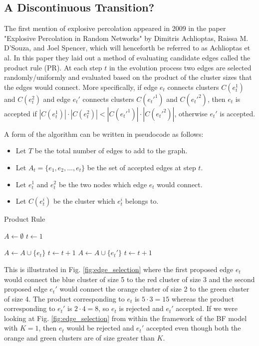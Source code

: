 \subsection{A Discontinuous Transition?}
The first mention of explosive percolation appeared in 2009 in the paper "Explosive Percolation in Random Networks" \cite{Achlioptas_1} by Dimitris Achlioptas, Raissa M. D’Souza, and Joel Spencer, which will henceforth be referred to as Achlioptas et al.
In this paper they laid out a method of evaluating candidate edges called the product rule (PR).
At each step $t$ in the evolution process two edges are selected randomly/uniformly and evaluated based on the product of the cluster sizes that the edges would connect.
More specifically, if edge $e_t$ connects clusters $C(e_t^1)$ and $C(e_t^2)$ and edge $e_t'$ connects clusters $C(e_t'^1)$ and $C(e_t'^2)$, then $e_t$ is accepted if $|C(e_t^1)| \cdot |C(e_t^2)| < |C(e_t'^1)| \cdot |C(e_t'^2)|$, otherwise $e_t'$ is accepted.

A form of the algorithm can be written in pseudocode as follows:
\begin{itemize}
	\item Let $T$ be the total number of edges to add to the graph.
	\item Let $A_t = \{e_1, e_2, ..., e_t\}$ be the set of accepted edges at step $t$.
	\item Let $e_t^1$ and $e_t^2$ be the two nodes which edge $e_t$ would connect.
	\item Let $C(e_t^i)$ be the cluster which $e_t^i$ belongs to.
\end{itemize}

\begin{algorithm}
	\caption{Product Rule}\label{Product-Rule}
	\begin{algorithmic}[1]
		\State $A \gets \emptyset$
		\State $t \gets 1$

				\State $A \gets A \cup \{e_t\}$
				\State $t \gets t+1$
			\Else
				\State $A \gets A \cup \{e_t'\}$
				\State $t \gets t+1$
			\EndIf
		\EndWhile
	\EndProcedure
	\end{algorithmic}
\end{algorithm}

This is illustrated in Fig. \ref{fig:edge_selection} where the first proposed edge $e_t$ would connect the blue cluster of size 5 to the red cluster of size 3 and the second proposed edge $e_t'$ would connect the orange cluster of size 2 to the green cluster of size 4.
The product corresponding to $e_t$ is $5 \cdot 3 = 15$ whereas the product corresponding to $e_t'$ is $2 \cdot 4 = 8$, so $e_t$ is rejected and $e_t'$ accepted.
If we were looking at Fig. \ref{fig:edge_selection} from within the framework of the BF model with $K = 1$, then $e_t$ would be rejected and $e_t'$ accepted even though both the orange and green clusters are of size greater than $K$.

